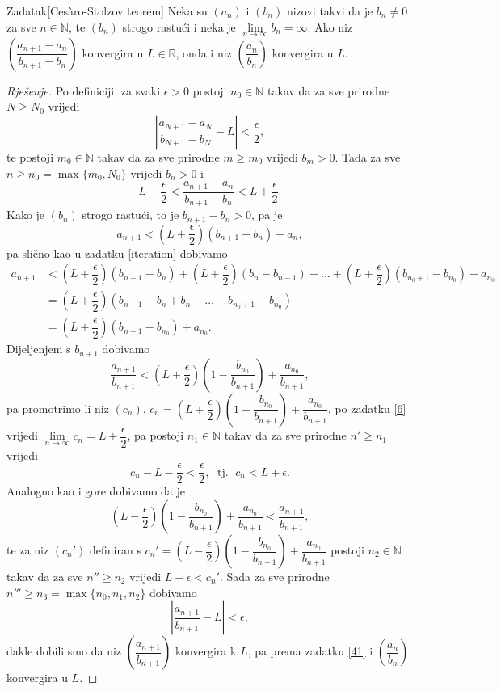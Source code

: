 \begin{exercise}{Zadatak}[Cesàro-Stolzov teorem] Neka su \((a_n)\) i \((b_n)\) nizovi takvi da je \(b_n\neq 0\) za sve \(n\in \mathbb{N}\), te \((b_n)\) strogo rastući i neka je \(\lim\limits_{n\to \infty}{b_n}=\infty\). Ako niz \(\left(\dfrac{a_{n+1}-a_n}{b_{n+1}-b_n}\right)\) konvergira u \(L\in \mathbb{R}\), onda i niz \(\left(\dfrac{a_n}{b_n}\right)\) konvergira u \(L\).
\end{exercise}
\begin{proof}[Rješenje]
Po definiciji, za svaki \(\epsilon>0\) postoji \(n_0\in \mathbb{N}\) takav da za sve prirodne \(N\geq N_0\) vrijedi
\[\left\lvert \dfrac{a_{N+1}-a_N}{b_{N+1}-b_N}-L\right\rvert<\dfrac{\epsilon}{2},\]
te postoji \(m_0\in \mathbb{N}\) takav da za sve prirodne \(m\geq m_0\) vrijedi \(b_m>0\). Tada za sve \(n\geq n_0=\max\{m_0, N_0\}\) vrijedi \(b_n>0\) i
\[L-\dfrac{\epsilon}{2}<\dfrac{a_{n+1}-a_n}{b_{n+1}-b_n}<L+\dfrac{\epsilon}{2}.\]
Kako je \((b_n)\) strogo rastući, to je \(b_{n+1}-b_n>0\), pa je
\[a_{n+1}<\left(L+\dfrac{\epsilon}{2}\right)(b_{n+1}-b_n)+a_n,\]
pa slično kao u zadatku \ref{iteration} dobivamo
\begin{align*}
a_{n+1}&<\left(L+\dfrac{\epsilon}{2}\right)(b_{n+1}-b_n)+\left(L+\dfrac{\epsilon}{2}\right)(b_{n}-b_{n-1})+\dots+ \left(L+\dfrac{\epsilon}{2}\right)(b_{n_0+1}-b_{n_0})+a_{n_0}\\
&=\left(L+\dfrac{\epsilon}{2}\right)(b_{n+1}-b_{n}+b_{n}-\dots+b_{n_0+1}-b_{n_0})\\
&=\left(L+\dfrac{\epsilon}{2}\right)(b_{n+1}-b_{n_0})+a_{n_0}.
\end{align*}
Dijeljenjem s \(b_{n+1}\) dobivamo
\[\dfrac{a_{n+1}}{b_{n+1}}<\left(L+\dfrac{\epsilon}{2}\right)\left(1-\dfrac{b_{n_0}}{b_{n+1}}\right)+\dfrac{a_{n_0}}{b_{n+1}},\]
pa promotrimo li niz \((c_n)\), \(c_n=\left(L+\dfrac{\epsilon}{2}\right)\left(1-\dfrac{b_{n_0}}{b_{n+1}}\right)+\dfrac{a_{n_0}}{b_{n+1}}\),
po zadatku \ref{6} vrijedi \(\lim\limits_{n\to \infty}{c_n}=L+\dfrac{\epsilon}{2}\), pa postoji \(n_1\in \mathbb{N}\) takav da za sve prirodne \(n'\geq n_1\) vrijedi \[c_{n}-L-\dfrac{\epsilon}{2}<\dfrac{\epsilon}{2},\;\text{ tj. }\; c_n<L+\epsilon.\]
Analogno kao i gore dobivamo da je
\[\left(L-\dfrac{\epsilon}{2}\right)\left(1-\dfrac{b_{n_0}}{b_{n+1}}\right)+\dfrac{a_{n_0}}{b_{n+1}}<\dfrac{a_{n+1}}{b_{n+1}},\]
te za niz \((c_n')\) definiran s \(c_n'=\left(L-\dfrac{\epsilon}{2}\right)\left(1-\dfrac{b_{n_0}}{b_{n+1}}\right)+\dfrac{a_{n_0}}{b_{n+1}}\) postoji \(n_2\in \mathbb{N}\) takav da za sve \(n''\geq n_2\) vrijedi \(L-\epsilon<c_n'\). Sada za sve prirodne \(n'''\geq n_3=\max\{n_0, n_1, n_2\}\) dobivamo
\[\left\lvert \dfrac{a_{n+1}}{b_{n+1}}-L\right\rvert<\epsilon,\]
dakle dobili smo da niz \(\left(\dfrac{a_{n+1}}{b_{n+1}}\right)\) konvergira k \(L\), pa prema zadatku \ref{41} i \(\left(\dfrac{a_{n}}{b_{n}}\right)\) konvergira u \(L\).
\end{proof}
